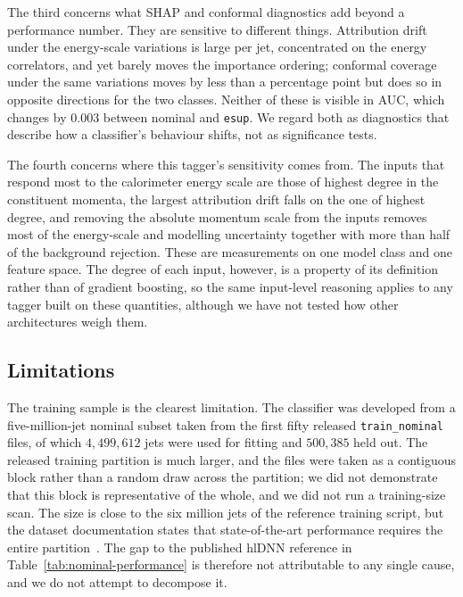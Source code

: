 \documentclass[pdflatex,sn-mathphys,Numbered,iicol]{sn-jnl}
\begin{document}
The third concerns what SHAP and conformal diagnostics add beyond a performance number.
They are sensitive to different things. Attribution drift under the energy-scale
variations is large per jet, concentrated on the energy correlators, and yet barely
moves the importance ordering; conformal coverage under the same variations moves by
less than a percentage point but does so in opposite directions for the two classes.
Neither of these is visible in AUC, which changes by $0.003$ between nominal and
\texttt{esup}. We regard both as diagnostics that describe how a classifier's behaviour
shifts, not as significance tests.

The fourth concerns where this tagger's sensitivity comes from. The inputs that respond
most to the calorimeter energy scale are those of highest degree in the constituent
momenta, the largest attribution drift falls on the one of highest degree, and removing the absolute momentum scale
from the inputs removes most of the energy-scale and modelling uncertainty together with
more than half of the background rejection. These are measurements on one model class
and one feature space. The degree of each input, however, is a property of its
definition rather than of gradient boosting, so the same input-level reasoning applies
to any tagger built on these quantities, although we have not tested how other
architectures weigh them.

\subsection{Limitations}
\label{sec:limitations}

The training sample is the clearest limitation. The classifier was developed from a
five-million-jet nominal subset taken from the first fifty released
\texttt{train\_nominal} files, of which $4{,}499{,}612$ jets were used for fitting and
$500{,}385$ held out. The released training partition is much larger, and the files were
taken as a contiguous block rather than a random draw across the partition; we did not
demonstrate that this block is representative of the whole, and we did not run a
training-size scan. The size is close to the six million jets of the reference training
script, but the dataset documentation states that state-of-the-art performance requires
the entire partition~\cite{ATLASGitLab}. The gap to the published hlDNN reference in
Table~\ref{tab:nominal-performance} is therefore not attributable to any single cause,
and we do not attempt to decompose it.
\end{document}
